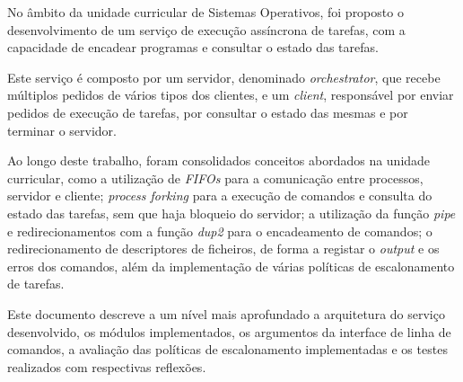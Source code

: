 \documentclass[a4paper,11pt]{scrreprt}
\begin{document}



\makecover



\renewenvironment{abstract}
 {\par\noindent\textbf{\Large\abstractname}\par\bigskip}
 {}

\begin{flushleft}
\begin{abstract}
    No âmbito da unidade curricular de Sistemas Operativos,
    foi proposto o desenvolvimento de um serviço de execução assíncrona de tarefas,
    com a capacidade de encadear programas e consultar o estado das tarefas.

    Este serviço é composto por um servidor, denominado \textit{orchestrator},
    que recebe múltiplos pedidos de vários tipos dos clientes, e um \textit{client}, responsável
    por enviar pedidos de execução de tarefas, por consultar o estado das mesmas e por terminar o servidor.

    Ao longo deste trabalho, foram consolidados conceitos abordados na unidade curricular,
    como a utilização de \textit{FIFOs} para a comunicação entre processos, servidor e cliente;
    \textit{process forking} para a execução de comandos e consulta do estado das tarefas,
    sem que haja bloqueio do servidor;
    a utilização da função \textit{pipe} e redirecionamentos com a função \textit{dup2} para o encadeamento de comandos;
    o redirecionamento de descriptores de ficheiros, de forma a registar o \textit{output} e os erros dos comandos,
    além da implementação de várias políticas de escalonamento de tarefas.

    Este documento descreve a um nível mais aprofundado a arquitetura do serviço desenvolvido,
    os módulos implementados, os argumentos da interface de linha de comandos, a avaliação das
    políticas de escalonamento implementadas e os testes realizados com respectivas reflexões.
\end{abstract}
\end{flushleft}
\end{document}
